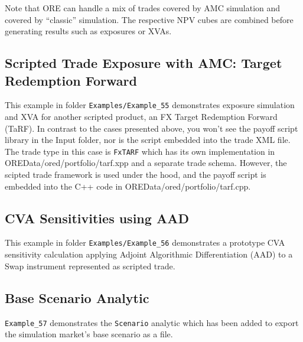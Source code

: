 Note that ORE can handle a mix of trades covered by AMC simulation and covered by ``classic'' simulation.
The respective NPV cubes are combined before generating results such as exposures or XVAs.

\subsection{Scripted Trade Exposure with AMC: Target Redemption Forward}%
\label{example:55}

This example in folder {\tt Examples/Example\_55} demonstrates exposure simulation and XVA for another scripted product, an
FX Target Redemption Forward (TaRF). In contrast to the cases presented above, you won't see
the payoff script library in the Input folder, nor is the script embedded into the trade XML file.
The trade type in this case is {\tt FxTARF} which has its own implementation in OREData/ored/portfolio/tarf.xpp
and a separate trade schema. However, the scipted trade framework is used under the hood, and the payoff
script is embedded into the C++ code in OREData/ored/portfolio/tarf.cpp.

\subsection{CVA Sensitivities using AAD}%
\label{example:56}

This example in folder {\tt Examples/Example\_56} demonstrates a prototype CVA sensitivity
calculation applying Adjoint Algorithmic Differentiation (AAD)
to a Swap instrument represented as scripted trade.

\subsection{Base Scenario Analytic}%
\label{example:57}

{\tt Example\_57} demonstrates the {\tt Scenario} analytic which has been added to export the simulation market's base scenario
as a file.

